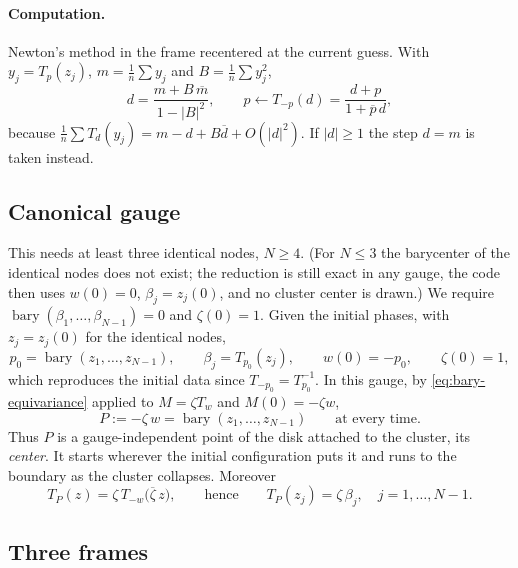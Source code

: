 \documentclass[a4paper,11pt]{article}
\newcommand{\conj}[1]{\overline{#1}}
\newcommand{\T}{T}                       %
\newcommand{\bary}{\operatorname{bary}}
\theoremstyle{remark}
\begin{document}
\paragraph{Computation.} Newton's method in the frame recentered at the current
guess. With $y_j=\T_p(z_j)$, $m=\frac1n\sum y_j$ and $B=\frac1n\sum y_j^2$,
\begin{equation}\label{eq:bary-newton}
d=\frac{m+B\,\conj m}{1-|B|^2},\qquad p\leftarrow\T_{-p}(d)=\frac{d+p}{1+\conj p\,d},
\end{equation}
because $\frac1n\sum\T_d(y_j)=m-d+B\conj d+O(|d|^2)$. If $|d|\ge1$ the step
$d=m$ is taken instead.

\subsection{Canonical gauge}

This needs at least three identical nodes, $N\ge4$. (For $N\le3$ the
barycenter of the identical nodes does not exist; the reduction is still exact
in any gauge, the code then uses $w(0)=0$, $\beta_j=z_j(0)$, and no cluster
center is drawn.) We require $\bary(\beta_1,\dots,\beta_{N-1})=0$ and $\zeta(0)=1$. Given the
initial phases, with $z_j=z_j(0)$ for the identical nodes,
\begin{equation}\label{eq:calibration}
p_0=\bary(z_1,\dots,z_{N-1}),\qquad \beta_j=\T_{p_0}(z_j),\qquad
w(0)=-p_0,\qquad \zeta(0)=1,
\end{equation}
which reproduces the initial data since $\T_{-p_0}=\T_{p_0}^{-1}$. In this gauge,
by \eqref{eq:bary-equivariance} applied to $M=\zeta\T_w$ and $M(0)=-\zeta w$,
\begin{equation}\label{eq:center}
P:=-\zeta\,w=\bary(z_1,\dots,z_{N-1})\qquad\text{at every time.}
\end{equation}
Thus $P$ is a gauge-independent point of the disk attached to the cluster, its
\emph{center}. It starts wherever the initial configuration puts it and runs to
the boundary as the cluster collapses. Moreover
\begin{equation}\label{eq:centered-frame}
\T_P(z)=\zeta\,\T_{-w}\bigl(\conj\zeta\,z\bigr),\qquad\text{hence}\qquad
\T_P(z_j)=\zeta\,\beta_j ,\quad j=1,\dots,N-1 .
\end{equation}

\subsection{Three frames}\label{sec:frames}
\end{document}
